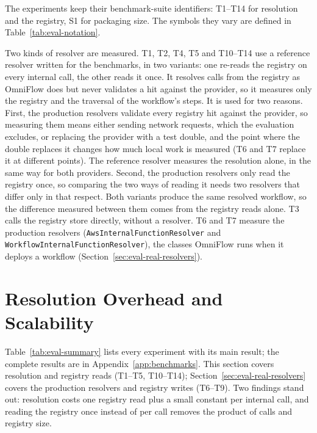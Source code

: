 The experiments keep their benchmark-suite identifiers: T1--T14 for resolution and the registry,
S1 for packaging size. The symbols they vary are defined in Table~\ref{tab:eval-notation}.

Two kinds of resolver are measured. T1, T2, T4, T5 and T10--T14 use a reference resolver written
for the benchmarks, in two variants: one re-reads the registry on every internal call, the other
reads it once. It resolves calls from the registry as OmniFlow does but never validates a hit
against the provider, so it measures only the registry and the traversal of the workflow's steps.
It is used for two reasons. First, the production resolvers validate every registry hit against
the provider, so measuring them means either sending network requests, which the evaluation
excludes, or replacing the provider with a test double, and the point where the double replaces it
changes how much local work is measured (T6 and T7 replace it at different points). The reference
resolver measures the resolution alone, in the same way for both providers. Second, the production
resolvers only read the registry once, so comparing the two ways of reading it needs two resolvers
that differ only in that respect. Both variants produce the same resolved workflow, so the
difference measured between them comes from the registry reads alone.
T3 calls the registry store directly, without a resolver. T6 and T7 measure the production resolvers
(\texttt{Aws\allowbreak Internal\allowbreak Function\allowbreak Resolver} and
\texttt{Workflow\allowbreak Internal\allowbreak Function\allowbreak Resolver}), the classes
OmniFlow runs when it deploys a workflow (Section~\ref{sec:eval-real-resolvers}).

\section{Resolution Overhead and Scalability}
\label{sec:eval-resolution}

Table~\ref{tab:eval-summary} lists every experiment with its main result; the complete results are
in Appendix~\ref{app:benchmarks}. This section covers resolution and registry reads (T1--T5,
T10--T14); Section~\ref{sec:eval-real-resolvers} covers the production resolvers and registry writes
(T6--T9). Two findings stand out: resolution costs one registry read plus a small constant per
internal call, and reading the registry once instead of per call removes the product of calls and
registry size.

